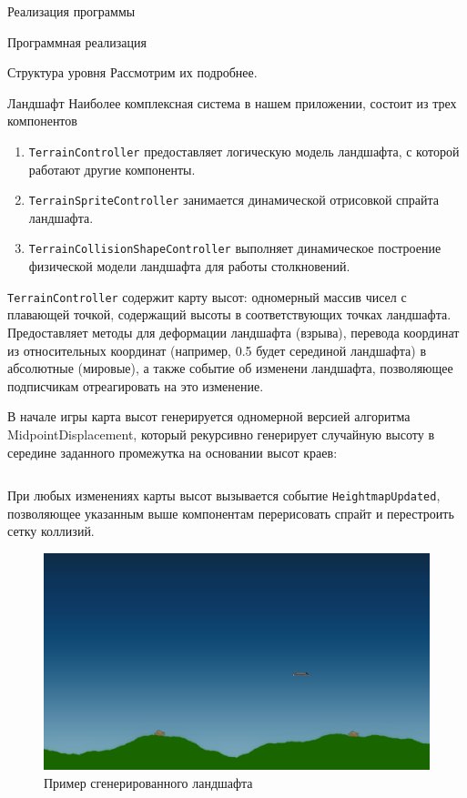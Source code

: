 \documentclass[a4paper, 14pt]{extarticle}
\numberwithin{equation}{section} %
\begin{document}
\begin{section}{Реализация программы}
\begin{subsection}{Программная реализация}
\begin{subsubsection}{Структура уровня}
Рассмотрим их подробнее.
\end{subsubsection}

\begin{subsubsection}{Ландшафт}
Наиболее комплексная система в нашем приложении, состоит из трех компонентов
\begin{enumerate}
\item \verb|TerrainController| предоставляет логическую модель ландшафта, с которой работают другие компоненты.
\item \verb|TerrainSpriteController| занимается динамической отрисовкой спрайта ландшафта.
\item \verb|TerrainCollisionShapeController| выполняет динамическое построение физической модели ландшафта для работы столкновений.
\end{enumerate}

\verb|TerrainController| содержит карту высот: одномерный массив чисел с плавающей точкой, содержащий высоты в соответствующих точках ландшафта.
Предоставляет методы для деформации ландшафта (взрыва), перевода координат из относительных координат (например, 0.5 будет серединой ландшафта) в абсолютные (мировые), а также событие об изменени ландшафта, позволяющее подписчикам отреагировать на это изменение.

В начале игры карта высот генерируется одномерной версией алгоритма MidpointDisplacement, который рекурсивно генерирует случайную высоту в середине заданного промежутка на основании высот краев:
\clearpage
\inputminted{cpp}{listings/MidpointDisplacement1D.cpp}

При любых изменениях карты высот вызывается событие \verb|HeightmapUpdated|, позволяющее указанным выше компонентам перерисовать спрайт и перестроить сетку коллизий.

\begin{figure}[h]
\includegraphics[width=\linewidth]{terrain}
\caption{Пример сгенерированного ландшафта}
\end{figure}
\end{subsubsection}


\end{subsection}
\end{section}
\end{document}
